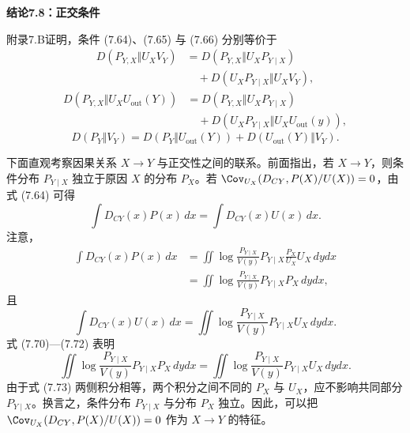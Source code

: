 \par\medskip{}\noindent\textbf{结论7.8：正交条件}\par
附录7.B证明，条件 (7.64)、(7.65) 与 (7.66) 分别等价于
\begin{equation}
\begin{aligned}
D(P_{Y,X}\Vert U_XV_Y)
&=D(P_{Y,X}\Vert U_XP_{Y\mid X})\\
&\hspace{1em}+D(U_XP_{Y\mid X}\Vert U_XV_Y),
\end{aligned}
\tag{7.67}
\end{equation}
\begin{equation}
\begin{aligned}
D(P_{Y,X}\Vert U_XU_{\mathrm{out}}(Y))
&=D(P_{Y,X}\Vert U_XP_{Y\mid X})\\
&\hspace{1em}+D(U_XP_{Y\mid X}\Vert U_XU_{\mathrm{out}}(y)),
\end{aligned}
\tag{7.68}
\end{equation}
\begin{equation}
D(P_Y\Vert V_Y)=D(P_Y\Vert U_{\mathrm{out}}(Y))+D(U_{\mathrm{out}}(Y)\Vert V_Y).
\tag{7.69}
\end{equation}

下面直观考察因果关系 $X\to Y$ 与正交性之间的联系。前面指出，若 $X\to Y$，则条件分布 $P_{Y\mid X}$ 独立于原因 $X$ 的分布 $P_X$。若 $\Cov_{U_X}(D_{CY},P(X)/U(X))=0$，由式 (7.64) 可得
\begin{equation}
\int D_{CY}(x)P(x)\,dx=\int D_{CY}(x)U(x)\,dx.
\tag{7.70}
\end{equation}
注意，
\begin{equation}
\begin{aligned}
\int D_{CY}(x)P(x)\,dx
&=\iint\log\frac{P_{Y\mid X}}{V(y)}P_{Y\mid X}\frac{P_X}{U_X}U_X\,dydx\\
&=\iint\log\frac{P_{Y\mid X}}{V(y)}P_{Y\mid X}P_X\,dydx,
\end{aligned}
\tag{7.71}
\end{equation}
且
\begin{equation}
\int D_{CY}(x)U(x)\,dx
=\iint\log\frac{P_{Y\mid X}}{V(y)}P_{Y\mid X}U_X\,dydx.
\tag{7.72}
\end{equation}
式 (7.70)—(7.72) 表明
\begin{equation}
\iint\log\frac{P_{Y\mid X}}{V(y)}P_{Y\mid X}P_X\,dydx
=\iint\log\frac{P_{Y\mid X}}{V(y)}P_{Y\mid X}U_X\,dydx.
\tag{7.73}
\end{equation}
由于式 (7.73) 两侧积分相等，两个积分之间不同的 $P_X$ 与 $U_X$，应不影响共同部分 $P_{Y\mid X}$。换言之，条件分布 $P_{Y\mid X}$ 与分布 $P_X$ 独立。因此，可以把 $\Cov_{U_X}(D_{CY},P(X)/U(X))=0$ 作为 $X\to Y$ 的特征。

